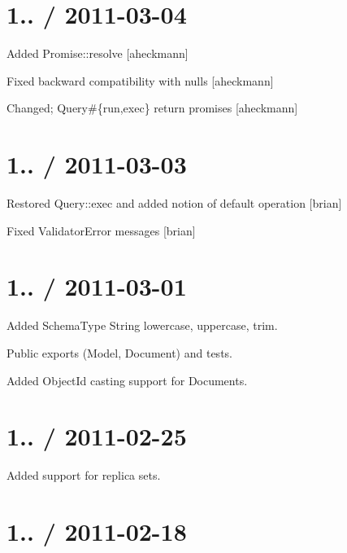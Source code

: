 \section*{1.. / 2011-\/03-\/04 }


\begin{DoxyItemize}
\item Added Promise\+::resolve \mbox{[}aheckmann\mbox{]}
\item Fixed backward compatibility with nulls \mbox{[}aheckmann\mbox{]}
\item Changed; Query\#\{run,exec\} return promises \mbox{[}aheckmann\mbox{]}
\end{DoxyItemize}

\section*{1.. / 2011-\/03-\/03 }


\begin{DoxyItemize}
\item Restored Query\+::exec and added notion of default operation \mbox{[}brian\mbox{]}
\item Fixed Validator\+Error messages \mbox{[}brian\mbox{]}
\end{DoxyItemize}

\section*{1.. / 2011-\/03-\/01 }


\begin{DoxyItemize}
\item Added Schema\+Type String {\ttfamily lowercase}, {\ttfamily uppercase}, {\ttfamily trim}.
\item Public exports ({\ttfamily Model}, {\ttfamily Document}) and tests.
\item Added Object\+Id casting support for {\ttfamily Document}s.
\end{DoxyItemize}

\section*{1.. / 2011-\/02-\/25 }


\begin{DoxyItemize}
\item Added support for replica sets.
\end{DoxyItemize}

\section*{1.. / 2011-\/02-\/18 }


